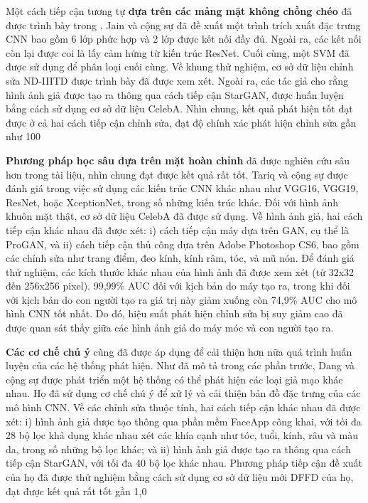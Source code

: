 \documentclass{article}
\begin{document}
Một cách tiếp cận tương tự \textbf{dựa trên các mảng mặt không chồng chéo} đã được trình bày trong . Jain và cộng sự đã đề xuất một trình trích xuất đặc trưng CNN bao gồm 6 lớp phức hợp và 2 lớp được kết nối đầy đủ. Ngoài ra, các kết nối còn lại được coi là lấy cảm hứng từ kiến trúc ResNet. Cuối cùng, một SVM đã được sử dụng để phân loại cuối cùng. Về khung thử nghiệm, cơ sở dữ liệu chỉnh sửa ND-IIITD được trình bày đã được xem xét. Ngoài ra, các tác giả cho rằng hình ảnh giả được tạo ra thông qua cách tiếp cận StarGAN, được huấn luyện bằng cách sử dụng cơ sở dữ liệu CelebA. Nhìn chung, kết quả phát hiện tốt đạt được ở cả hai cách tiếp cận chỉnh sửa, đạt độ chính xác phát hiện chỉnh sửa gần như 100%

\textbf{Phương pháp học sâu dựa trên mặt hoàn chỉnh} đã được nghiên cứu sâu hơn trong tài liệu, nhìn chung đạt được kết quả rất tốt. Tariq và cộng sự được đánh giá trong  việc sử dụng các kiến trúc CNN khác nhau như VGG16, VGG19, ResNet, hoặc XceptionNet, trong số những kiến trúc khác. Đối với hình ảnh khuôn mặt thật, cơ sở dữ liệu CelebA đã được sử dụng. Về hình ảnh giả, hai cách tiếp cận khác nhau đã được xét: i) cách tiếp cận máy dựa trên GAN, cụ thể là ProGAN, và ii) cách tiếp cận thủ công dựa trên Adobe Photoshop CS6, bao gồm các chỉnh sửa như trang điểm, đeo kính, kính râm, tóc, và mũ nón. Để đánh giá thử nghiệm, các kích thước khác nhau của hình ảnh đã được xem xét (từ 32x32 đến 256x256 pixel). 99,99\% AUC đối với kịch bản do máy tạo ra, trong khi đối với kịch bản do con người tạo ra giá trị này giảm xuống còn 74,9\% AUC cho mô hình CNN tốt nhất. Do đó, hiệu suất phát hiện chỉnh sửa bị suy giảm cao đã được quan sát thấy giữa các hình ảnh giả do máy móc và con người tạo ra.

\textbf{Các cơ chế chú ý} cũng đã được áp dụng để cải thiện hơn nữa quá trình huấn luyện của các hệ thống phát hiện. Như đã mô tả trong các phần trước, Dang và cộng sự được phát triển một hệ thống có thể phát hiện các loại giả mạo khác nhau. Họ đã sử dụng cơ chế chú ý để xử lý và cải thiện bản đồ đặc trưng của các mô hình CNN. Về các chỉnh sửa thuộc tính, hai cách tiếp cận khác nhau đã được xét: i) hình ảnh giả được tạo thông qua phần mềm FaceApp công khai, với tối đa 28 bộ lọc khả dụng khác nhau xét các khía cạnh như tóc, tuổi, kính, râu và màu da, trong số những bộ lọc khác; và ii) hình ảnh giả được tạo ra thông qua cách tiếp cận StarGAN, với tối đa 40 bộ lọc khác nhau. Phương pháp tiếp cận đề xuất của họ đã được thử nghiệm bằng cách sử dụng cơ sở dữ liệu mới DFFD của họ, đạt được kết quả rất tốt gần 1,0%
\end{document}
